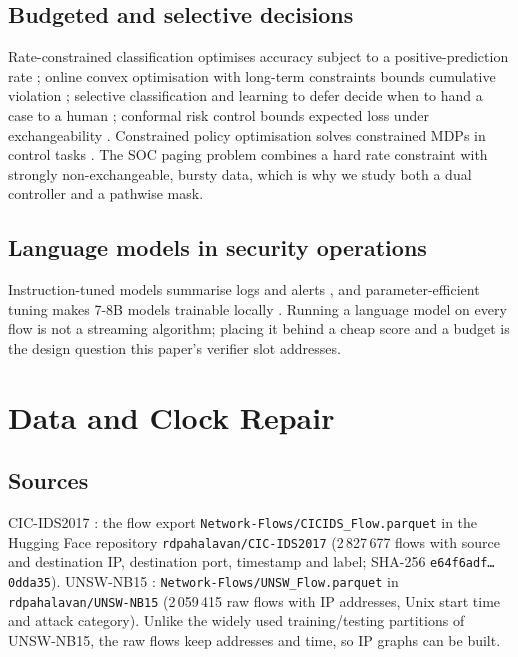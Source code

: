 \documentclass[journal,10pt,twocolumn]{IEEEtran}
\begin{document}
\subsection{Budgeted and selective decisions}
Rate-constrained classification optimises accuracy subject to a positive-prediction rate \cite{cotter2019constraints}; online convex optimisation with long-term constraints bounds cumulative violation \cite{mahdavi2012longterm}; selective classification and learning to defer decide when to hand a case to a human \cite{geifman2017selective,mozannar2020defer}; conformal risk control bounds expected loss under exchangeability \cite{angelopoulos2024crc}. Constrained policy optimisation solves constrained MDPs in control tasks \cite{achiam2017cpo,tessler2019rcpo,altman1999cmdp}. The SOC paging problem combines a hard rate constraint with strongly non-exchangeable, bursty data, which is why we study both a dual controller and a pathwise mask.

\subsection{Language models in security operations}
Instruction-tuned models summarise logs and alerts \cite{liu2023logprompt,motlagh2024llmsec}, and parameter-efficient tuning makes 7-8B models trainable locally \cite{hu2022lora,dettmers2023qlora,dubey2024llama3}. Running a language model on every flow is not a streaming algorithm; placing it behind a cheap score and a budget is the design question this paper's verifier slot addresses.

\section{Data and Clock Repair}
\label{sec:clock}
\subsection{Sources}
CIC-IDS2017 \cite{sharafaldin2018cicids}: the flow export \texttt{Network-Flows/CICIDS\_Flow.parquet} in the Hugging Face repository \texttt{rdpahalavan/CIC-IDS2017} (2\,827\,677 flows with source and destination IP, destination port, timestamp and label; SHA-256 \texttt{e64f6adf\ldots0dda35}). UNSW-NB15 \cite{moustafa2015unsw}: \texttt{Network-Flows/UNSW\_Flow.parquet} in \texttt{rdpahalavan/UNSW-NB15} (2\,059\,415 raw flows with IP addresses, Unix start time and attack category). Unlike the widely used training/testing partitions of UNSW-NB15, the raw flows keep addresses and time, so IP graphs can be built.
\end{document}
